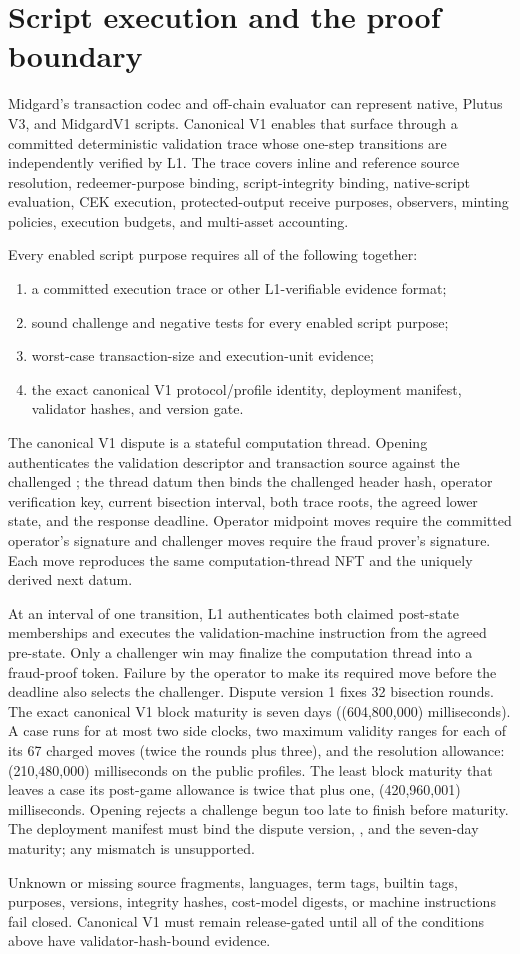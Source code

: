 \documentclass[../midgard.tex]{subfiles}
\begin{document}
\section{Script execution and the proof boundary}
\label{s:phase-two-fraud-proofs}

Midgard's transaction codec and off-chain evaluator can represent native,
Plutus V3, and MidgardV1 scripts. Canonical V1 enables that surface through a
committed deterministic validation trace whose one-step transitions are
independently verified by L1. The trace covers inline and reference source
resolution, redeemer-purpose binding, script-integrity binding, native-script
evaluation, CEK execution, protected-output receive purposes, observers,
minting policies, execution budgets, and multi-asset accounting.

Every enabled script purpose requires all of the following together:

\begin{enumerate}
    \item a committed execution trace or other L1-verifiable evidence format;
    \item sound challenge and negative tests for every enabled script purpose;
    \item worst-case transaction-size and execution-unit evidence;
    \item the exact canonical V1 protocol/profile identity, deployment manifest,
          validator hashes, and version gate.
\end{enumerate}

The canonical V1 dispute is a stateful computation thread. Opening authenticates
the validation descriptor and transaction source against the challenged
; the thread datum then binds the challenged header hash,
operator verification key, current bisection interval, both trace roots, the
agreed lower state, and the response deadline. Operator midpoint moves require
the committed operator's signature and challenger moves require the fraud
prover's signature. Each move reproduces the same computation-thread NFT and
the uniquely derived next datum.

At an interval of one transition, L1 authenticates both claimed post-state
memberships and executes the validation-machine instruction from the agreed
pre-state. Only a challenger win may finalize the computation thread into a
fraud-proof token. Failure by the operator to make its required move before
the deadline also selects the challenger. Dispute version 1 fixes 32
bisection rounds. The exact canonical V1 block maturity is seven days
((604{,}800{,}000) milliseconds). A case runs for at most two side clocks, two
maximum validity ranges for each of its 67 charged moves (twice the rounds plus
three), and the resolution allowance: (210{,}480{,}000) milliseconds on the
public profiles. The least block maturity that leaves a case its post-game
allowance is twice that plus one, (420{,}960{,}001) milliseconds. Opening
rejects a challenge begun too late to finish before maturity. The deployment
manifest must bind the dispute version, , and the
seven-day maturity; any mismatch is unsupported.

Unknown or missing source fragments, languages, term tags, builtin tags,
purposes, versions, integrity hashes, cost-model digests, or machine
instructions fail closed. Canonical V1 must remain release-gated until all of the
conditions above have validator-hash-bound evidence.
\end{document}
